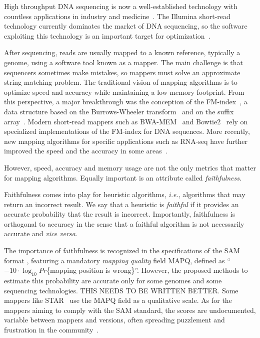 \documentclass[a4,center,fleqn]{NAR}
\begin{document}
High throughput DNA sequencing is now a well-established technology with
countless applications in industry and medicine~\cite{pmid30084865}. The
Illumina short-read technology currently dominates the market of DNA
sequencing, so the software exploiting this technology is an important
target for optimization~\cite{Wikillu}.

After sequencing, reads are usually mapped to a known reference, typically
a genome, using a software tool known as a mapper. The main challenge is
that sequencers sometimes make mistakes, so mappers must solve an
approximate string-matching problem. The traditional vision of mapping
algorithms is to optimize speed and accuracy while maintaining a low
memory footprint. From this perspective, a major breakthrough was the
conception of the FM-index~\cite{ferragina2000opportunistic,
ferragina2005indexing}, a data structure based on the Burrows-Wheeler
transform~\cite{burrows1994block} and on the suffix
array~\cite{manber1993suffix}. Modern short-read mappers such as
BWA-MEM~\cite{li2013aligning} and Bowtie2~\cite{pmid22388286} rely on
specialized implementations of the FM-index for DNA sequences. More
recently, new mapping algorithms for specific applications such as RNA-seq
have further improved the speed and the accuracy in some
areas~\cite{pmid27043002}.

However, speed, accuracy and memory usage are not the only metrics that
matter for mapping algorithms. Equally important is an attribute called
\emph{faithfulness}.

Faithfulness comes into play for heuristic algorithms, \textit{i.e.},
algorithms that may return an incorrect result. We say that a heuristic is
\emph{faithful} if it provides an accurate probability that the result is
incorrect. Importantly, faithfulness is orthogonal to accuracy in the
sense that a faithful algorithm is not necessarily accurate and
\textit{vice versa}.

\enlargethispage{-65.1pt}

The importance of faithfulness is recognized in the specifications of the
SAM format \cite{pmid19505943}, featuring a mandatory \emph{mapping
quality} field MAPQ, defined as ``$-10 \cdot \log_{10}Pr$\{mapping
position is wrong\}''. However, the proposed methods to estimate this
probability are accurate only for some genomes and some sequencing
technologies.
THIS NEEDS TO BE WRITTEN BETTER.
Some mappers
like STAR~\cite{pmid23104886} use the MAPQ field as a qualitative scale.
As for the mappers aiming to comply with the SAM standard, the scores are
undocumented, variable between mappers and versions, often spreading
puzzlement and frustration in the community~\cite{ACGT, QCFail}.
\end{document}
